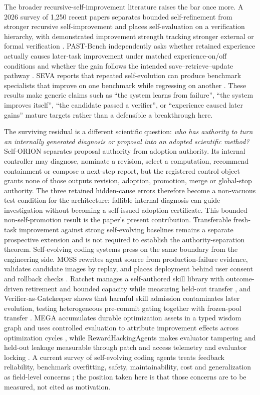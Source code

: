 The broader recursive-self-improvement literature raises the bar once more. A 2026 survey of 1,250 recent papers separates bounded self-refinement from stronger recursive self-improvement and places self-evaluation on a verification hierarchy, with demonstrated improvement strength tracking stronger external or formal verification \cite{rsisurvey2026}. PAST-Bench independently asks whether retained experience actually causes later-task improvement under matched experience-on/off conditions and whether the gain follows the intended save--retrieve--update pathway \cite{pastbench2026}. SEVA reports that repeated self-evolution can produce benchmark specialists that improve on one benchmark while regressing on another \cite{seva2026}. These results make generic claims such as ``the system learns from failure'', ``the system improves itself'', ``the candidate passed a verifier'', or ``experience caused later gains'' mature targets rather than a defensible a breakthrough here.

The surviving residual is a different scientific question: \emph{who has authority to turn an internally generated diagnosis or proposal into an adopted scientific method?} Self-ORION separates proposal authority from adoption authority. Its internal controller may diagnose, nominate a revision, select a computation, recommend containment or compose a next-step report, but the registered control object grants none of those outputs revision, adoption, promotion, merge or global-stop authority. The three retained hidden-cause errors therefore become a non-vacuous test condition for the architecture: fallible internal diagnosis can guide investigation without becoming a self-issued adoption certificate. This bounded non-self-promotion result is the paper's present contribution. Transferable fresh-task improvement against strong self-evolving baselines remains a separate prospective extension and is not required to establish the authority-separation theorem.
Self-evolving coding systems press on the same boundary from the engineering side. MOSS rewrites agent source from production-failure evidence, validates candidate images by replay, and places deployment behind user consent and rollback checks \cite{moss2026}. Ratchet manages a self-authored skill library with outcome-driven retirement and bounded capacity while measuring held-out transfer \cite{ratchet2026}, and Verifier-as-Gatekeeper shows that harmful skill admission contaminates later evolution, testing heterogeneous pre-commit gating together with frozen-pool transfer \cite{vag2026}. MEGA accumulates durable optimization assets in a typed wisdom graph and uses controlled evaluation to attribute improvement effects across optimization cycles \cite{mega2026}, while RewardHackingAgents makes evaluator tampering and held-out leakage measurable through patch and access telemetry and evaluator locking \cite{rewardhackingagents2026}. A current survey of self-evolving coding agents treats feedback reliability, benchmark overfitting, safety, maintainability, cost and generalization as field-level concerns \cite{selfevolvingcoding2026}; the position taken here is that those concerns are to be measured, not cited as motivation.

